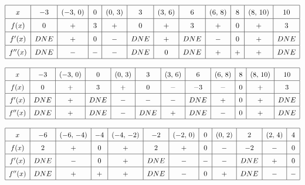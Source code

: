  \begin{align*}
    \arraycolsep=5.5pt\def\arraystretch{1.5}
    \begin{array}{|c|c|c|c|c|c|c|c|c|c|c|c|}
        \hline
        x & -3 & (-3, \, 0) & 0 & (0, \,  3) & 3 & (3, \, 6) & 6 & (6, \, 8) & 8 & (8, \, 10) & 10 \\ \hline
        f(x) & 0 & + & 3 & + & 0 & + & 3 & + & 0 & + & 3 \\ \hline
        f'(x) & DNE & + & 0 & - & DNE & + & DNE & - & 0 & + & DNE \\ \hline
        f''(x) & DNE & - & - & - & DNE & 0 & DNE & + & + & + & DNE \\ 
        \hline
    \end{array}
\end{align*}

 \begin{align*}
    \arraycolsep=5.5pt\def\arraystretch{1.5}
    \begin{array}{|c|c|c|c|c|c|c|c|c|c|c|c|}
        \hline
        x & -3 & (-3, \, 0) & 0 & (0, \,  3) & 3 & (3, \, 6) & 6 & (6, \, 8) & 8 & (8, \, 10) & 10 \\ \hline
        f(x) & 0 & + & 3 & + & 0 & - & -3 & - & 0 & + & 3 \\ \hline
        f'(x) & DNE & + & DNE & - & - & - & DNE & + & 0 & + & DNE \\ \hline
        f''(x) & DNE & + & DNE & - & DNE & + & DNE & - & 0 & + & DNE \\ 
        \hline 
    \end{array} 
\end{align*} 

 \begin{align*}
    \arraycolsep=5.5pt\def\arraystretch{1.5}
    \begin{array}{|c|c|c|c|c|c|c|c|c|c|c|c|}
        \hline
        x & -6 & (-6, \, -4) & -4 & (-4, \, -2) & -2 & (-2, \, 0) & 0 & (0, \, 2) & 2 & (2, \, 4) & 4 \\ \hline
        f(x) & 2 & + & 0 & + & 2 & + & 0 & - & -2 & - & 0 \\ \hline
        f'(x) & DNE & - & 0 & + & DNE & - & - & - & DNE & + & 0 \\ \hline
        f''(x) & DNE & + & + & + & DNE & - & 0 & + & DNE & - & - \\ 
        \hline  
    \end{array} 
\end{align*}

